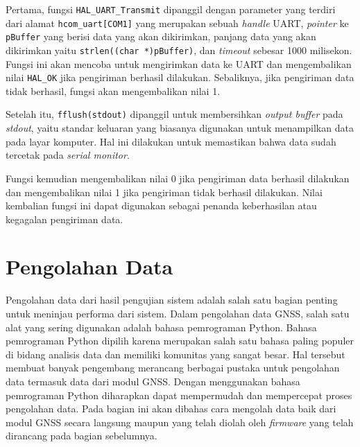 Pertama, fungsi \texttt{HAL\_UART\_Transmit} dipanggil dengan parameter yang terdiri dari alamat \texttt{hcom\_uart[COM1]} yang merupakan sebuah \textit{handle} UART, \textit{pointer} ke \texttt{pBuffer} yang berisi data yang akan dikirimkan, panjang data yang akan dikirimkan yaitu \texttt{strlen((char *)pBuffer)}, dan \textit{timeout} sebesar 1000 milisekon. Fungsi ini akan mencoba untuk mengirimkan data ke UART dan mengembalikan nilai \texttt{HAL\_OK} jika pengiriman berhasil dilakukan. Sebaliknya, jika pengiriman data tidak berhasil, fungsi akan mengembalikan nilai 1.

Setelah itu, \texttt{fflush(stdout)} dipanggil untuk membersihkan \textit{output buffer} pada \textit{stdout}, yaitu standar keluaran yang biasanya digunakan untuk menampilkan data pada layar komputer. Hal ini dilakukan untuk memastikan bahwa data sudah tercetak pada \textit{serial monitor}.

Fungsi kemudian mengembalikan nilai 0 jika pengiriman data berhasil dilakukan dan mengembalikan nilai 1 jika pengiriman tidak berhasil dilakukan. Nilai kembalian fungsi ini dapat digunakan sebagai penanda keberhasilan atau kegagalan pengiriman data.

\section{Pengolahan Data}
Pengolahan data dari hasil pengujian sistem adalah salah satu bagian penting untuk meninjau performa dari sistem. Dalam pengolahan data GNSS, salah satu alat yang sering digunakan adalah bahasa pemrograman Python. Bahasa pemrograman Python dipilih karena merupakan salah satu bahasa paling populer di bidang analisis data dan memiliki komunitas yang sangat besar. Hal tersebut membuat banyak pengembang merancang berbagai pustaka untuk pengolahan data termasuk data dari modul GNSS. Dengan menggunakan bahasa pemrograman Python diharapkan dapat mempermudah dan mempercepat proses pengolahan data. Pada bagian ini akan dibahas cara mengolah data baik dari modul GNSS secara langsung maupun yang telah diolah oleh \textit{firmware} yang telah dirancang pada bagian sebelumnya.

